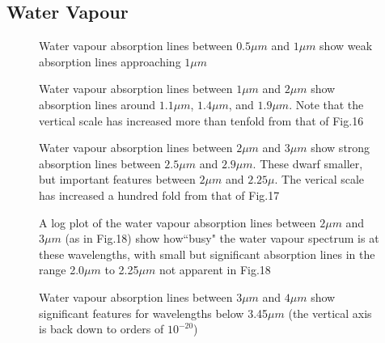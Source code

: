 \documentclass[12pt]{article}
\begin{document}
\subsection{Water Vapour}

\vspace*{11.5cm}
\begin{figure}[htb]
\caption{Water vapour absorption lines between $0.5\mu m$ and $1\mu m$ show weak absorption lines
approaching $1\mu m$}  
\end{figure}
\newpage

\vspace*{11.5cm}
\begin{figure}[htb]
\caption{Water vapour absorption lines between $1\mu m$ and $2\mu m$ show absorption lines
around $1.1\mu m$, $1.4\mu m$, and $1.9 \mu m$. Note that the vertical scale has increased more than
 tenfold from that of Fig.16}  
\end{figure}
\newpage

\vspace*{11.5cm}
\begin{figure}[htb]
\caption{Water vapour absorption lines between $2\mu m$ and $3\mu m$ show strong absorption lines
between $2.5\mu m$  and $2.9 \mu m$. These dwarf smaller, but important features between $2\mu m$ and
 $2.25 \mu$.  The verical scale has increased a hundred fold from that of Fig.17}
\end{figure}
\newpage

\vspace*{11.5cm}
\begin{figure}[htb]
\caption{A log plot of the water vapour absorption lines between $2\mu m$ and $3\mu m$ (as in Fig.18)
   show how``busy"
 the water vapour spectrum is at these wavelengths, with small but significant absorption
lines in the range  2.0$\mu m$ to  2.25$\mu m$
 not apparent in Fig.18}    
\end{figure}
\newpage



\vspace*{11.5cm}
\begin{figure}[htb]
\caption{Water vapour absorption lines between $3\mu m$ and $4\mu m$
   show significant features for wavelengths below 3.45$\mu m$ (the vertical axis
 is back down to orders of $10^{-20}$)}    
\end{figure}
\newpage
\end{document}
